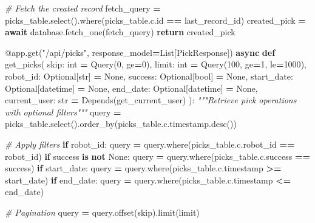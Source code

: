 \documentclass[
]{article}
\newenvironment{Shaded}{\begin{snugshade}}{\end{snugshade}}
\newcommand{\AttributeTok}[1]{\textcolor[rgb]{0.13,0.29,0.53}{#1}}
\newcommand{\BuiltInTok}[1]{#1}
\newcommand{\CommentTok}[1]{\textcolor[rgb]{0.56,0.35,0.01}{\textit{#1}}}
\newcommand{\ControlFlowTok}[1]{\textcolor[rgb]{0.13,0.29,0.53}{\textbf{#1}}}
\newcommand{\DecValTok}[1]{\textcolor[rgb]{0.00,0.00,0.81}{#1}}
\newcommand{\KeywordTok}[1]{\textcolor[rgb]{0.13,0.29,0.53}{\textbf{#1}}}
\newcommand{\NormalTok}[1]{#1}
\newcommand{\OperatorTok}[1]{\textcolor[rgb]{0.81,0.36,0.00}{\textbf{#1}}}
\newcommand{\StringTok}[1]{\textcolor[rgb]{0.31,0.60,0.02}{#1}}
\newcommand{\VariableTok}[1]{\textcolor[rgb]{0.00,0.00,0.00}{#1}}
\begin{document}
\begin{Shaded}
\begin{Highlighting}[]
    \CommentTok{\# Fetch the created record}
\NormalTok{    fetch\_query }\OperatorTok{=}\NormalTok{ picks\_table.select().where(picks\_table.c.}\BuiltInTok{id} \OperatorTok{==}\NormalTok{ last\_record\_id)}
\NormalTok{    created\_pick }\OperatorTok{=} \ControlFlowTok{await}\NormalTok{ database.fetch\_one(fetch\_query)}
    \ControlFlowTok{return}\NormalTok{ created\_pick}

\AttributeTok{@app.get}\NormalTok{(}\StringTok{"/api/picks"}\NormalTok{, response\_model}\OperatorTok{=}\NormalTok{List[PickResponse])}
\ControlFlowTok{async} \KeywordTok{def}\NormalTok{ get\_picks(}
\NormalTok{    skip: }\BuiltInTok{int} \OperatorTok{=}\NormalTok{ Query(}\DecValTok{0}\NormalTok{, ge}\OperatorTok{=}\DecValTok{0}\NormalTok{),}
\NormalTok{    limit: }\BuiltInTok{int} \OperatorTok{=}\NormalTok{ Query(}\DecValTok{100}\NormalTok{, ge}\OperatorTok{=}\DecValTok{1}\NormalTok{, le}\OperatorTok{=}\DecValTok{1000}\NormalTok{),}
\NormalTok{    robot\_id: Optional[}\BuiltInTok{str}\NormalTok{] }\OperatorTok{=} \VariableTok{None}\NormalTok{,}
\NormalTok{    success: Optional[}\BuiltInTok{bool}\NormalTok{] }\OperatorTok{=} \VariableTok{None}\NormalTok{,}
\NormalTok{    start\_date: Optional[datetime] }\OperatorTok{=} \VariableTok{None}\NormalTok{,}
\NormalTok{    end\_date: Optional[datetime] }\OperatorTok{=} \VariableTok{None}\NormalTok{,}
\NormalTok{    current\_user: }\BuiltInTok{str} \OperatorTok{=}\NormalTok{ Depends(get\_current\_user)}
\NormalTok{):}
    \CommentTok{"""Retrieve pick operations with optional filters"""}
\NormalTok{    query }\OperatorTok{=}\NormalTok{ picks\_table.select().order\_by(picks\_table.c.timestamp.desc())}

    \CommentTok{\# Apply filters}
    \ControlFlowTok{if}\NormalTok{ robot\_id:}
\NormalTok{        query }\OperatorTok{=}\NormalTok{ query.where(picks\_table.c.robot\_id }\OperatorTok{==}\NormalTok{ robot\_id)}
    \ControlFlowTok{if}\NormalTok{ success }\KeywordTok{is} \KeywordTok{not} \VariableTok{None}\NormalTok{:}
\NormalTok{        query }\OperatorTok{=}\NormalTok{ query.where(picks\_table.c.success }\OperatorTok{==}\NormalTok{ success)}
    \ControlFlowTok{if}\NormalTok{ start\_date:}
\NormalTok{        query }\OperatorTok{=}\NormalTok{ query.where(picks\_table.c.timestamp }\OperatorTok{\textgreater{}=}\NormalTok{ start\_date)}
    \ControlFlowTok{if}\NormalTok{ end\_date:}
\NormalTok{        query }\OperatorTok{=}\NormalTok{ query.where(picks\_table.c.timestamp }\OperatorTok{\textless{}=}\NormalTok{ end\_date)}

    \CommentTok{\# Pagination}
\NormalTok{    query }\OperatorTok{=}\NormalTok{ query.offset(skip).limit(limit)}


\end{Highlighting}
\end{Shaded}
\end{document}
